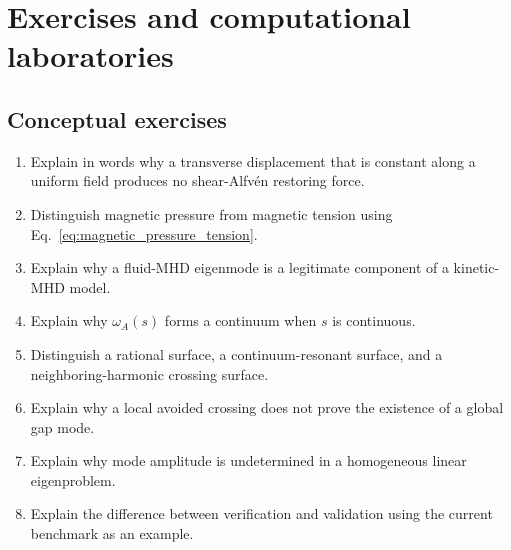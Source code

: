 \section{Exercises and computational laboratories}
\label{sec:exercises}

\subsection{Conceptual exercises}
\begin{enumerate}[leftmargin=1.8em]
\item Explain in words why a transverse displacement that is constant along a uniform field produces no shear-Alfv\'en restoring force.
\item Distinguish magnetic pressure from magnetic tension using Eq.~\eqref{eq:magnetic_pressure_tension}.
\item Explain why a fluid-MHD eigenmode is a legitimate component of a kinetic-MHD model.
\item Explain why $\omega_A(s)$ forms a continuum when $s$ is continuous.
\item Distinguish a rational surface, a continuum-resonant surface, and a neighboring-harmonic crossing surface.
\item Explain why a local avoided crossing does not prove the existence of a global gap mode.
\item Explain why mode amplitude is undetermined in a homogeneous linear eigenproblem.
\item Explain the difference between verification and validation using the current benchmark as an example.
\end{enumerate}


